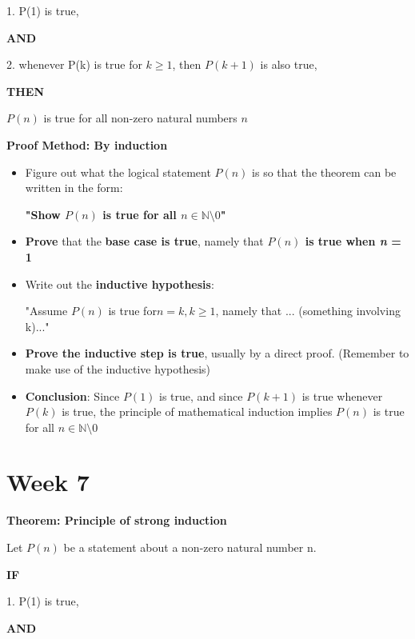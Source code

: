 \documentclass{article}
\newcommand*{\N}{\mathbb{N}}
\begin{document}
\hspace{\parindent} 1. P(1) is true,

\hspace{\parindent} \textbf{AND}

\hspace{\parindent} 2. whenever P(k) is true for \(k \geq 1\), then \(P(k+1)\) is also true,

\hspace{\parindent} \textbf{THEN}

\hspace{\parindent} \(P(n)\) is true for all non-zero natural numbers \(n\)

\textbf{Proof Method: By induction}
\begin{itemize}
    \item Figure out what the logical statement \(P(n)\) is so that the theorem can be written in the form:
    
    \textbf{"Show \(P(n)\) is true for all \(n \in \N \setminus {0}\)"}
    \item \textbf{Prove} that the \textbf{base case is true}, namely that \textbf{\(P(n)\) is true when \textit{n} = 1}
    \item Write out the \textbf{inductive hypothesis}:
    
    "Assume \(P(n)\) is true for\(n=k,k \geq 1\), namely that ... (something involving k)..."
    \item \textbf{Prove the inductive step is true}, usually by a direct proof. (Remember to make use of the inductive hypothesis)
    \item \textbf{Conclusion}: Since \(P(1)\) is true, and since \(P(k+1)\) is true whenever \(P(k)\) is true, the principle of mathematical induction implies \(P(n)\) is true for all \(n \in \N \setminus {0}\)
\end{itemize}

\section{Week 7}
\textbf{Theorem: Principle of strong induction}

Let \(P(n)\) be a statement about a non-zero natural number n.

\hspace{\parindent} \textbf{IF}

\hspace{\parindent} 1. P(1) is true,

\hspace{\parindent} \textbf{AND}
\end{document}
